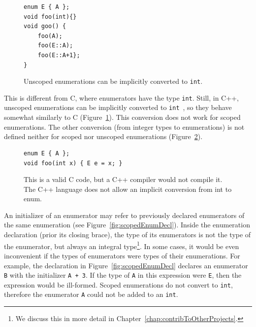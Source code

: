 \documentclass[nolot,nolof,nocover,printed]{fithesis3}
\newcommand{\stdN}[2]{\cite[#2]{#1}\xspace}
\begin{document}
\begin{figure}
\begin{lstlisting}
enum E { A };
void foo(int){}
void goo() {
    foo(A);
    foo(E::A);
    foo(E::A+1};
}
\end{lstlisting}
\caption{Unscoped enumerations can be implicitly converted to \texttt{int}.}
\label{fig:unscopedEnumToInt}
\end{figure}


This is different from C, where enumerators have the type \texttt{int}. Still, in C++, unscoped enumerations can be implicitly converted to \texttt{int}~\stdN{n4296}{\S 7.2/10}, so they behave somewhat similarly to C (Figure~\ref{fig:unscopedEnumToInt}). This conversion does not work for scoped enumerations. The other conversion (from integer types to enumerations) is not defined neither for scoped nor unscoped enumerations (Figure~\ref{fig:noConversionFromIntToEnum}).

\begin{figure}
\begin{lstlisting}
enum E { A };
void foo(int x) { E e = x; }
\end{lstlisting}
\caption{This is a valid C code, but a C++ compiler would not compile it. The C++ language does not allow an implicit conversion from int to enum. }
\label{fig:noConversionFromIntToEnum}
\end{figure}

An initializer of an enumerator may refer to previously declared enumerators of the same enumeration (see Figure~\ref{fig:scopedEnumDecl}). Inside the enumeration declaration (prior its closing brace), the type of its enumerators is not the type of the enumerator, but always an integral type\footnote{We discuss this in more detail in Chapter~\ref{chap:contribToOtherProjects}.}.
In some cases, it would be even inconvenient if the types of enumerators were types of their enumerations. For example, the declaration in Figure~\ref{fig:scopedEnumDecl} declares an enumerator \texttt{B} with the initializer \lstinline|A + 3|. If the type of \texttt{A} in this expression were \texttt{E}, then the expression would be ill-formed. Scoped enumerations do not convert to \texttt{int}, therefore the enumerator \lstinline|A| could not be added to an \texttt{int}.

%
%
\end{document}
